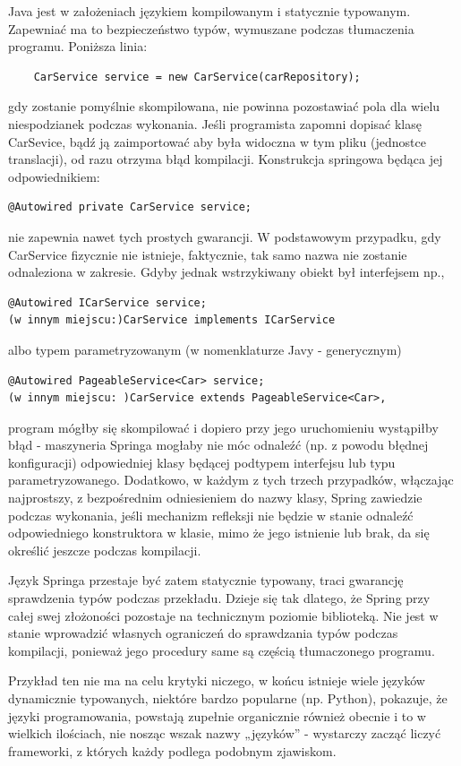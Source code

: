 Java jest w założeniach językiem kompilowanym i statycznie typowanym. Zapewniać ma to bezpieczeństwo typów, wymuszane podczas tłumaczenia programu. Poniższa linia:
\begin{lstlisting}
    CarService service = new CarService(carRepository);
\end{lstlisting}
gdy zostanie pomyślnie skompilowana, nie powinna pozostawiać pola dla wielu niespodzianek podczas wykonania.
Jeśli programista zapomni dopisać klasę CarSevice, bądź ją zaimportować aby była widoczna w tym pliku (jednostce translacji), od razu otrzyma błąd kompilacji.
Konstrukcja springowa będąca jej odpowiednikiem:
\begin{lstlisting}
@Autowired private CarService service;
\end{lstlisting}
nie zapewnia nawet tych prostych gwarancji. W podstawowym przypadku, gdy CarService fizycznie nie istnieje, faktycznie, tak samo nazwa nie zostanie odnaleziona w zakresie. Gdyby jednak wstrzykiwany obiekt był interfejsem np.,
\begin{lstlisting}
@Autowired ICarService service; 
(w innym miejscu:)CarService implements ICarService
\end{lstlisting}
albo typem parametryzowanym (w nomenklaturze Javy - generycznym)
\begin{lstlisting}
@Autowired PageableService<Car> service; 
(w innym miejscu: )CarService extends PageableService<Car>,
\end{lstlisting}
program mógłby się skompilować i dopiero przy jego uruchomieniu wystąpiłby błąd - maszyneria Springa mogłaby nie móc odnaleźć (np. z powodu błędnej konfiguracji) odpowiedniej klasy będącej podtypem interfejsu lub typu parametryzowanego. Dodatkowo, w każdym z tych trzech przypadków, włączając najprostszy, z bezpośrednim odniesieniem do nazwy klasy, Spring zawiedzie podczas wykonania, jeśli mechanizm refleksji nie będzie w stanie odnaleźć odpowiedniego konstruktora w klasie, mimo że jego istnienie lub brak, da się określić jeszcze podczas kompilacji.

Język Springa przestaje być zatem statycznie typowany, traci gwarancję sprawdzenia typów podczas przekładu. Dzieje się tak dlatego, że Spring przy całej swej złożoności pozostaje na technicznym poziomie biblioteką. Nie jest w stanie wprowadzić własnych ograniczeń do sprawdzania typów podczas kompilacji, ponieważ jego procedury same są częścią tłumaczonego programu. 

Przykład ten nie ma na celu krytyki niczego, w końcu istnieje wiele języków dynamicznie typowanych, niektóre bardzo popularne (np. Python), pokazuje,  że języki programowania, powstają zupełnie organicznie również obecnie i to w wielkich ilościach, nie nosząc wszak nazwy „języków” - wystarczy zacząć liczyć frameworki, z których każdy podlega podobnym zjawiskom.

